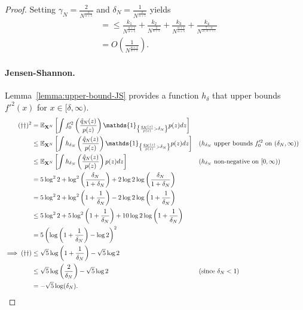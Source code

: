 \begin{proof}
Setting $\gamma_N = \frac{2}{N^\frac{2}{\alpha+5}}$ and $\delta_N = \frac{1}{N^\frac{2}{\alpha+5}}$ yields
%
\begin{align*}
    &= \leq  \frac{k_1}{N^{\frac{\alpha+1}{\alpha+5}}} + \frac{k_2}{N^{\frac{2}{\alpha+5}}}
    + \frac{k_3}{N^{\frac{\alpha+1}{\alpha+5}}} 
    + \frac{k_4}{N^{\frac{7-\alpha}{2(\alpha+5)}}} \\
    & = O\left(\frac{1}{N^\frac{\alpha+1}{\alpha+5}} \right).
\end{align*}


\paragraph{Jensen-Shannon.}
Lemma~\ref{lemma:upper-bound-JS} provides a function $h_\delta$ that upper bounds $f'^2(x)$ for $x \in[\delta, \infty)$.
%
\begin{align*}
    (\dagger\dagger)^2 
    &= \E_{\XN} \left[\int f_0'^2\left(\frac{\hat{q}_N(z)}{p(z)} \right) \mathds{1}_{\left\lbrace \frac{\hat{q}_N(z)}{p(z)} > \delta_N \right\rbrace} p(z) dz \right]
    \\
    &\leq \E_{\XN} \left[\int h_{\delta_N}\left(\frac{\hat{q}_N(z)}{p(z)} \right) \mathds{1}_{\left\lbrace \frac{\hat{q}_N(z)}{p(z)} > \delta_N \right\rbrace} p(z) dz \right]
    && \text{($h_{\delta_N}$ upper bounds $f_0'^2$ on $(\delta_N, \infty)$)}
    \\
    &\leq \E_{\XN} \left[\int h_{\delta_N}\left(\frac{\hat{q}_N(z)}{p(z)} \right) p(z) dz \right]
    && \text{($h_{\delta_N}$ non-negative on $[0, \infty)$)}
    \\
    &= 5\log^2 2 + \log^2\left( \frac{\delta_N}{1+\delta_N} \right) + 2\log 2 \log\left( \frac{\delta_N}{1+\delta_N} \right)\\
    &= 5\log^2 2 + \log^2\left(1 + \frac{1}{\delta_N}\right) - 2\log 2 \log\left(1 + \frac{1}{\delta_N}\right)\\
    &\leq 5\log^2 2 + 5\log^2\left(1 + \frac{1}{\delta_N}\right) + 10\log 2 \log\left(1 + \frac{1}{\delta_N}\right)\\
    &=5\left(\log\left(1 + \frac{1}{\delta_N} \right) - \log 2\right)^2\\
    \implies (\dagger\dagger)&\leq 
    \sqrt{5}\log\left(1 + \frac{1}{\delta_N} \right) - \sqrt{5}\log 2 \\
    &\leq \sqrt{5}\log\left(\frac{2}{\delta_N} \right) - \sqrt{5}\log 2 && \text{(since $\delta_N<1$)}\\
    &= -\sqrt{5}\log(\delta_N).
\end{align*}

\end{proof}
